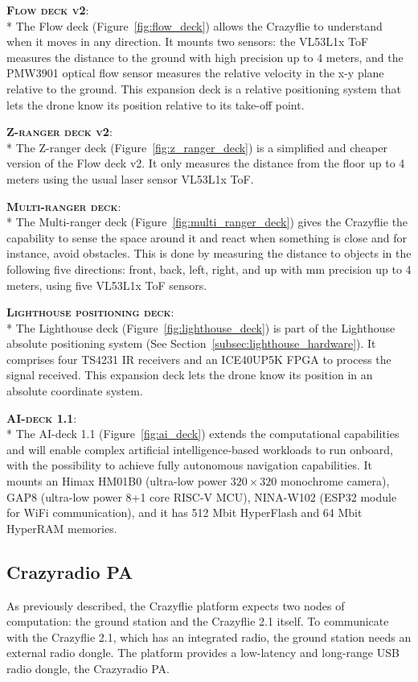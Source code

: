 {\bfseries \scshape Flow deck v2}\label{deck:flow}:\\*
The Flow deck (Figure~\ref{fig:flow_deck}) allows the Crazyflie to understand when it moves in any direction. 
It mounts two sensors: the VL53L1x ToF measures the distance to the ground with high precision up to 4 meters, and the PMW3901 optical flow sensor measures the relative velocity in the x-y plane relative to the ground. 
This expansion deck is a relative positioning system that lets the drone know its position relative to its take-off point.

{\bfseries \scshape Z-ranger deck v2}\label{deck:z_ranger}:\\*
The Z-ranger deck (Figure~\ref{fig:z_ranger_deck}) is a simplified and cheaper version of the Flow deck v2.
It only measures the distance from the floor up to 4 meters using the usual laser sensor VL53L1x ToF.

{\bfseries \scshape Multi-ranger deck}\label{deck:multi_ranger}:\\*
The Multi-ranger deck (Figure~\ref{fig:multi_ranger_deck}) gives the Crazyflie the capability to sense the space around it and react when something is close and for instance, avoid obstacles.
This is done by measuring the distance to objects in the following five directions: front, back, left, right, and up with mm precision up to 4 meters, using five VL53L1x ToF sensors.


{\bfseries \scshape Lighthouse positioning deck}\label{deck:lighthouse}:\\*
The Lighthouse deck (Figure~\ref{fig:lighthouse_deck}) is part of the Lighthouse absolute positioning system (See Section~\ref{subsec:lighthouse_hardware}). 
It comprises four TS4231 IR receivers and an ICE40UP5K FPGA to process the signal received.
This expansion deck lets the drone know its position in an absolute coordinate system.

{\bfseries \scshape AI-deck 1.1}\label{deck:ai}:\\*
The AI-deck 1.1 (Figure~\ref{fig:ai_deck}) extends the computational capabilities and will enable complex artificial intelligence-based workloads to run onboard, with the possibility to achieve fully autonomous navigation capabilities. 
It mounts an Himax HM01B0 (ultra-low power \(320 \times 320\) monochrome camera), GAP8 (ultra-low power 8+1 core RISC-V MCU), NINA-W102 (ESP32 module for WiFi communication), and it has 512 Mbit HyperFlash and 64 Mbit HyperRAM memories. 


\subsection{Crazyradio PA}\label{subsec:crazyradio}
As previously described, the Crazyflie platform expects two nodes of computation: the ground station and the Crazyflie 2.1 itself. 
To communicate with the Crazyflie 2.1, which has an integrated radio, the ground station needs an external radio dongle. 
The platform provides a low-latency and long-range USB radio dongle, the Crazyradio PA.


